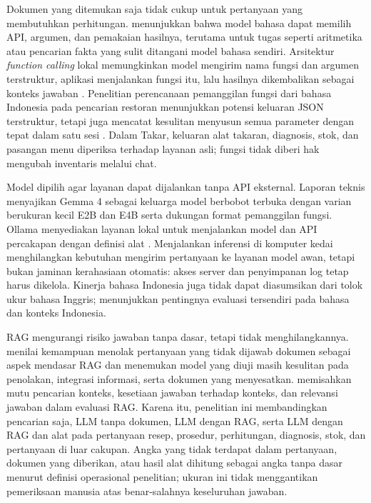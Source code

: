 Dokumen yang ditemukan saja tidak cukup untuk pertanyaan yang membutuhkan perhitungan. \citet{schick2023toolformer} menunjukkan bahwa model bahasa dapat memilih API, argumen, dan pemakaian hasilnya, terutama untuk tugas seperti aritmetika atau pencarian fakta yang sulit ditangani model bahasa sendiri. Arsitektur \textit{function calling} lokal memungkinkan model mengirim nama fungsi dan argumen terstruktur, aplikasi menjalankan fungsi itu, lalu hasilnya dikembalikan sebagai konteks jawaban \citep*{ollama2026ollama}. Penelitian perencanaan pemanggilan fungsi dari bahasa Indonesia pada pencarian restoran menunjukkan potensi keluaran JSON terstruktur, tetapi juga mencatat kesulitan menyusun semua parameter dengan tepat dalam satu sesi \citep*{mauludin2026large}. Dalam Takar, keluaran alat takaran, diagnosis, stok, dan pasangan menu diperiksa terhadap layanan asli; fungsi tidak diberi hak mengubah inventaris melalui chat.

Model dipilih agar layanan dapat dijalankan tanpa API eksternal. Laporan teknis \citet*{gemmateam2026gemma4} menyajikan Gemma 4 sebagai keluarga model berbobot terbuka dengan varian berukuran kecil E2B dan E4B serta dukungan format pemanggilan fungsi. Ollama menyediakan layanan lokal untuk menjalankan model dan API percakapan dengan definisi alat \citep*{ollama2026ollama}. Menjalankan inferensi di komputer kedai menghilangkan kebutuhan mengirim pertanyaan ke layanan model awan, tetapi bukan jaminan kerahasiaan otomatis: akses server dan penyimpanan log tetap harus dikelola. Kinerja bahasa Indonesia juga tidak dapat diasumsikan dari tolok ukur bahasa Inggris; \citet*{koto2023large} menunjukkan pentingnya evaluasi tersendiri pada bahasa dan konteks Indonesia.

RAG mengurangi risiko jawaban tanpa dasar, tetapi tidak menghilangkannya. \citet*{chen2024benchmarking} menilai kemampuan menolak pertanyaan yang tidak dijawab dokumen sebagai aspek mendasar RAG dan menemukan model yang diuji masih kesulitan pada penolakan, integrasi informasi, serta dokumen yang menyesatkan. \citet*{es2024ragas} memisahkan mutu pencarian konteks, kesetiaan jawaban terhadap konteks, dan relevansi jawaban dalam evaluasi RAG. Karena itu, penelitian ini membandingkan pencarian saja, LLM tanpa dokumen, LLM dengan RAG, serta LLM dengan RAG dan alat pada pertanyaan resep, prosedur, perhitungan, diagnosis, stok, dan pertanyaan di luar cakupan. Angka yang tidak terdapat dalam pertanyaan, dokumen yang diberikan, atau hasil alat dihitung sebagai angka tanpa dasar menurut definisi operasional penelitian; ukuran ini tidak menggantikan pemeriksaan manusia atas benar-salahnya keseluruhan jawaban.

